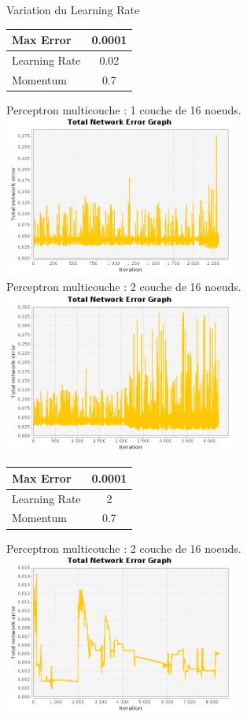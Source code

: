 \documentclass[10pt]{report}
\begin{document}
\begin{center}
Variation du Learning Rate\\
\begin{tabular}{|l|c|}
	\hline
	Max Error & 0.0001 \\
	\hline
	Learning Rate & 0.02 \\
	\hline
	Momentum & 0.7 \\
	\hline
\end{tabular}

Perceptron multicouche : 1 couche de 16 noeuds.\\
\includegraphics[height=200px]{img/SQUARE_16_101_lr002.png}\\
Perceptron multicouche : 2 couche de 16 noeuds.\\
\includegraphics[height=200px]{img/SQUARE_16_16_101_lr002.png}\\

\begin{tabular}{|l|c|}
	\hline
	Max Error & 0.0001 \\
	\hline
	Learning Rate & 2 \\
	\hline
	Momentum & 0.7 \\
	\hline
\end{tabular}

Perceptron multicouche : 2 couche de 16 noeuds.\\
\includegraphics[height=200px]{img/SQUARE_16_101_lr2.png}\\
\end{center}
\end{document}
